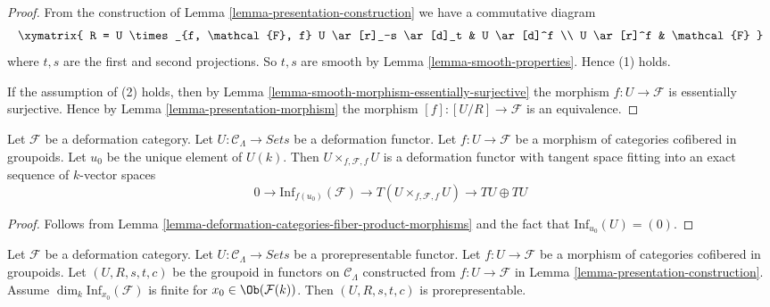 \begin{proof}
From the construction of
Lemma \ref{lemma-presentation-construction}
we have a commutative diagram
$$
\xymatrix{
R = U \times_{f, \mathcal{F}, f} U \ar[r]_-s \ar[d]_t & U
\ar[d]^f \\
U \ar[r]^f & \mathcal{F}
}
$$
where $t, s$ are the first and second projections.  So $t, s$ are smooth by
Lemma \ref{lemma-smooth-properties}.  Hence (1) holds.

\medskip\noindent
If the assumption of (2) holds, then by
Lemma \ref{lemma-smooth-morphism-essentially-surjective}
the morphism $f : U \to \mathcal{F}$ is essentially surjective. Hence by
Lemma \ref{lemma-presentation-morphism}
the morphism $[f] : [U/R] \to \mathcal{F}$ is an equivalence.
\end{proof}

\begin{lemma}
\label{lemma-deformation-functor-diagonal}
Let $\mathcal{F}$ be a deformation category.
Let $U : \mathcal{C}_\Lambda \to \textit{Sets}$ be a deformation functor.
Let $f: U \to \mathcal{F}$ be a morphism of categories cofibered in groupoids.
Let $u_0$ be the unique element of $U(k)$.
Then $U \times_{f, \mathcal{F}, f} U$ is a deformation functor
with tangent space fitting into an exact sequence of $k$-vector spaces
$$
0 \to \text{Inf}_{f(u_0)}(\mathcal{F}) \to
T(U \times_{f, \mathcal{F}, f} U) \to TU \oplus TU
$$
\end{lemma}

\begin{proof}
Follows from
Lemma \ref{lemma-deformation-categories-fiber-product-morphisms}
and the fact that $\text{Inf}_{u_0}(U) = (0)$.
\end{proof}

\begin{lemma}
\label{lemma-prorepresentable-groupoid-in-functors-construction}
Let $\mathcal{F}$ be a deformation category.
Let $U : \mathcal{C}_\Lambda \to \textit{Sets}$ be a prorepresentable functor.
Let $f : U \to \mathcal{F}$ be a morphism of categories cofibered in groupoids.
Let $(U, R, s, t, c)$ be the groupoid in functors on $\mathcal{C}_\Lambda$
constructed from $f : U \to \mathcal{F}$ in
Lemma \ref{lemma-presentation-construction}. Assume
$\dim_k \text{Inf}_{x_0}(\mathcal{F})$ is finite for
$x_0 \in \Ob(\mathcal{F}(k))$. Then $(U, R, s, t, c)$ is prorepresentable.
\end{lemma}

